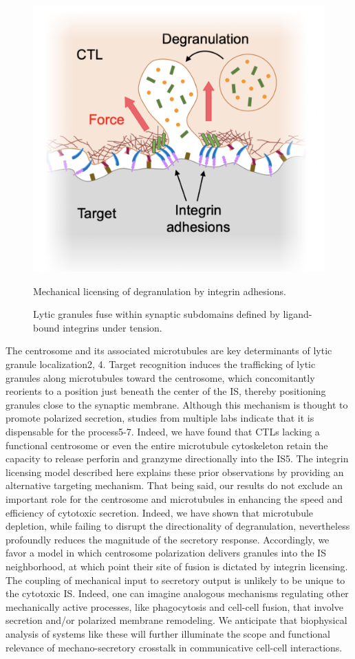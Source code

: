 \begin{figure}[htbp]
	\centering
	\includegraphics[width=0.7\columnwidth]{../figures/chapter3/discintegrinmodel.png}
	\caption{Mechanical licensing of degranulation by integrin adhesions.}
	\caption*{Lytic granules fuse within synaptic subdomains defined by ligand-bound integrins under tension.}
	\label{fig:discintegrinmodel}
\end{figure}

The centrosome and its associated microtubules are key determinants of lytic granule localization2, 4. Target recognition induces the trafficking of lytic granules along microtubules toward the centrosome, which concomitantly reorients to a position just beneath the center of the IS, thereby positioning granules close to the synaptic membrane. Although this mechanism is thought to promote polarized secretion, studies from multiple labs indicate that it is dispensable for the process5-7. Indeed, we have found that CTLs lacking a functional centrosome or even the entire microtubule cytoskeleton retain the capacity to release perforin and granzyme directionally into the IS5. The integrin licensing model described here explains these prior observations by providing an alternative targeting mechanism. That being said, our results do not exclude an important role for the centrosome and microtubules in enhancing the speed and efficiency of cytotoxic secretion. Indeed, we have shown that microtubule depletion, while failing to disrupt the directionality of degranulation, nevertheless profoundly reduces the magnitude of the secretory response. Accordingly, we favor a model in which centrosome polarization delivers granules into the IS neighborhood, at which point their site of fusion is dictated by integrin licensing. The coupling of mechanical input to secretory output is unlikely to be unique to the cytotoxic IS. Indeed, one can imagine analogous mechanisms regulating other mechanically active processes, like phagocytosis and cell-cell fusion, that involve secretion and/or polarized membrane remodeling. We anticipate that biophysical analysis of systems like these will further illuminate the scope and functional relevance of mechano-secretory crosstalk in communicative cell-cell interactions.

